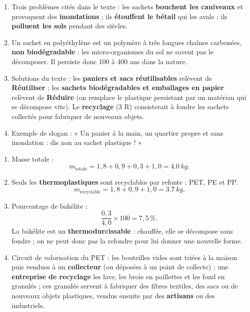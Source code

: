 \documentclass[11pt]{article}
\begin{document}
\begin{corrige}
\begin{enumerate}
\item Trois problèmes cités dans le texte : les sachets \textbf{bouchent les caniveaux} et provoquent des \textbf{inondations} ; ils \textbf{étouffent le bétail} qui les avale ; ils \textbf{polluent les sols} pendant des siècles.
\item Un sachet en polyéthylène est un polymère à très longues chaînes carbonées, \textbf{non biodégradable} : les micro-organismes du sol ne savent pas le décomposer. Il persiste donc 100 à 400 ans dans la nature.
\item Solutions du texte : les \textbf{paniers et sacs réutilisables} relèvent de \textbf{Réutiliser} ; les \textbf{sachets biodégradables et emballages en papier} relèvent de \textbf{Réduire} (on remplace le plastique persistant par un matériau qui se décompose vite). Le \textbf{recyclage} (3\ieme{} R) consisterait à fondre les sachets collectés pour fabriquer de nouveaux objets.
\item Exemple de slogan : « Un panier à la main, un quartier propre et sans inondation : dis non au sachet plastique ! »
\end{enumerate}
\end{corrige}

\begin{corrige}
\begin{enumerate}
\item Masse totale :
\[ m_{\text{totale}} = 1,8 + 0,9 + 0,3 + 1,0 = \SI{4,0}{kg}. \]
\item Seuls les \textbf{thermoplastiques} sont recyclables par refonte : PET, PE et PP.
\[ m_{\text{recyclable}} = 1,8 + 0,9 + 1,0 = \SI{3,7}{kg}. \]
\item Pourcentage de bakélite :
\[ \frac{0,3}{4,0} \times 100 = 7,5\,\%. \]
La bakélite est un \textbf{thermodurcissable} : chauffée, elle se décompose sans fondre ; on ne peut donc pas la refondre pour lui donner une nouvelle forme.
\item Circuit de valorisation du PET : les bouteilles vides sont triées à la maison puis vendues à un \textbf{collecteur} (ou déposées à un point de collecte) ; une \textbf{entreprise de recyclage} les lave, les broie en paillettes et les fond en granulés ; ces granulés servent à fabriquer des fibres textiles, des sacs ou de nouveaux objets plastiques, vendus ensuite par des \textbf{artisans} ou des industriels.
\end{enumerate}
\end{corrige}
\end{document}
